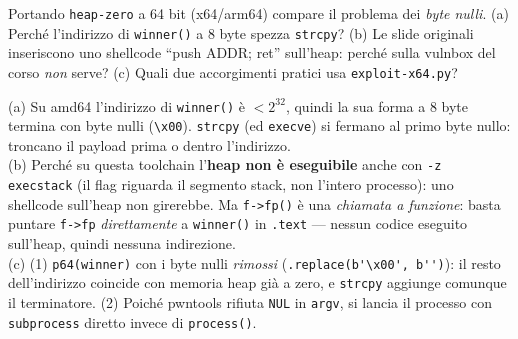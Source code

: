 \question[6]
Portando \lstinline|heap-zero| a 64 bit (x64/arm64) compare il problema dei \emph{byte nulli}. (a) Perché l'indirizzo di \lstinline|winner()| a 8 byte spezza \lstinline|strcpy|? (b) Le slide originali inseriscono uno shellcode ``push ADDR; ret'' sull'heap: perché sulla vulnbox del corso \emph{non} serve? (c) Quali due accorgimenti pratici usa \lstinline|exploit-x64.py|?
\begin{solution}
(a) Su amd64 l'indirizzo di \lstinline|winner()| è $< 2^{32}$, quindi la sua forma a 8 byte termina con byte nulli (\lstinline|\x00|). \lstinline|strcpy| (ed \lstinline|execve|) si fermano al primo byte nullo: troncano il payload prima o dentro l'indirizzo.\\
(b) Perché su questa toolchain l'\textbf{heap non è eseguibile} anche con \lstinline|-z execstack| (il flag riguarda il segmento stack, non l'intero processo): uno shellcode sull'heap non girerebbe. Ma \lstinline|f->fp()| è una \emph{chiamata a funzione}: basta puntare \lstinline|f->fp| \emph{direttamente} a \lstinline|winner()| in \lstinline|.text| --- nessun codice eseguito sull'heap, quindi nessuna indirezione.\\
(c) (1) \lstinline|p64(winner)| con i byte nulli \emph{rimossi} (\lstinline|.replace(b'\x00', b'')|): il resto dell'indirizzo coincide con memoria heap già a zero, e \lstinline|strcpy| aggiunge comunque il terminatore. (2) Poiché pwntools rifiuta \lstinline|NUL| in \lstinline|argv|, si lancia il processo con \lstinline|subprocess| diretto invece di \lstinline|process()|.
\end{solution}
